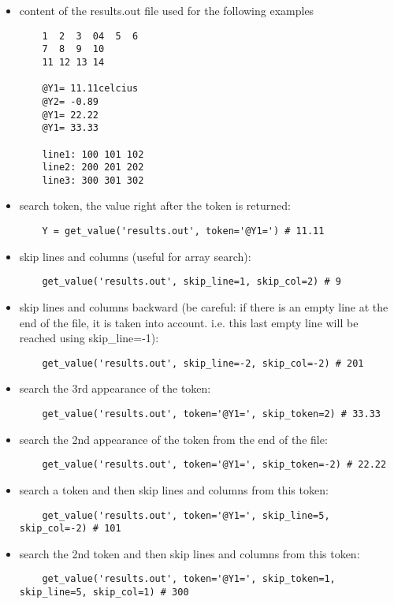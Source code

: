 \begin{itemize}
\item content of the results.out file used for the following examples
  \begin{lstlisting}
    1  2  3  04  5  6
    7  8  9  10
    11 12 13 14

    @Y1= 11.11celcius
    @Y2= -0.89
    @Y1= 22.22
    @Y1= 33.33

    line1: 100 101 102
    line2: 200 201 202
    line3: 300 301 302
  \end{lstlisting}
\item search token, the value right after the token is returned: \\
  \begin{lstlisting}
    Y = get_value('results.out', token='@Y1=') # 11.11
  \end{lstlisting}
\item skip lines and columns (useful for array search):\\
  \begin{lstlisting}
    get_value('results.out', skip_line=1, skip_col=2) # 9
  \end{lstlisting}
\item skip lines and columns backward (be careful: if there is an empty line at the end of the file, it is taken into account. i.e. this last empty line will be reached using skip\_line=-1):\\
  \begin{lstlisting}
    get_value('results.out', skip_line=-2, skip_col=-2) # 201
  \end{lstlisting}
\item search the 3rd appearance of the token:\\
  \begin{lstlisting}
    get_value('results.out', token='@Y1=', skip_token=2) # 33.33
  \end{lstlisting}
\item search the 2nd appearance of the token from the end of the file:\\
  \begin{lstlisting}
    get_value('results.out', token='@Y1=', skip_token=-2) # 22.22
  \end{lstlisting}
\item search a token and then skip lines and columns from this token:\\
  \begin{lstlisting}
    get_value('results.out', token='@Y1=', skip_line=5, skip_col=-2) # 101
  \end{lstlisting}
\item search the 2nd token and then skip lines and columns from this token:\\
  \begin{lstlisting}
    get_value('results.out', token='@Y1=', skip_token=1, skip_line=5, skip_col=1) # 300
  \end{lstlisting}
\end{itemize}

